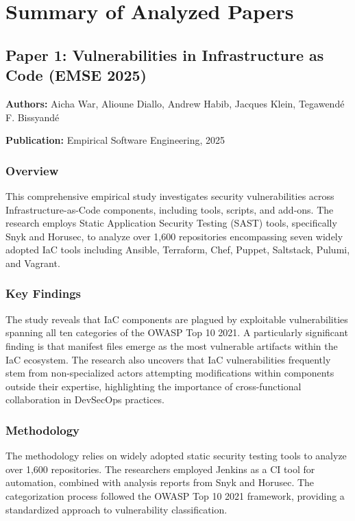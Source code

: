 \documentclass[11pt,a4paper]{article}
\begin{document}
\section{Summary of Analyzed Papers}

\subsection{Paper 1: Vulnerabilities in Infrastructure as Code (EMSE 2025)}

\textbf{Authors:} Aicha War, Alioune Diallo, Andrew Habib, Jacques Klein, Tegawendé F. Bissyandé

\textbf{Publication:} Empirical Software Engineering, 2025

\subsubsection{Overview}
This comprehensive empirical study investigates security vulnerabilities across Infrastructure-as-Code components, including tools, scripts, and add-ons. The research employs Static Application Security Testing (SAST) tools, specifically Snyk and Horusec, to analyze over 1,600 repositories encompassing seven widely adopted IaC tools including Ansible, Terraform, Chef, Puppet, Saltstack, Pulumi, and Vagrant.

\subsubsection{Key Findings}
The study reveals that IaC components are plagued by exploitable vulnerabilities spanning all ten categories of the OWASP Top 10 2021. A particularly significant finding is that manifest files emerge as the most vulnerable artifacts within the IaC ecosystem. The research also uncovers that IaC vulnerabilities frequently stem from non-specialized actors attempting modifications within components outside their expertise, highlighting the importance of cross-functional collaboration in DevSecOps practices.

\subsubsection{Methodology}
The methodology relies on widely adopted static security testing tools to analyze over 1,600 repositories. The researchers employed Jenkins as a CI tool for automation, combined with analysis reports from Snyk and Horusec. The categorization process followed the OWASP Top 10 2021 framework, providing a standardized approach to vulnerability classification.
\end{document}
